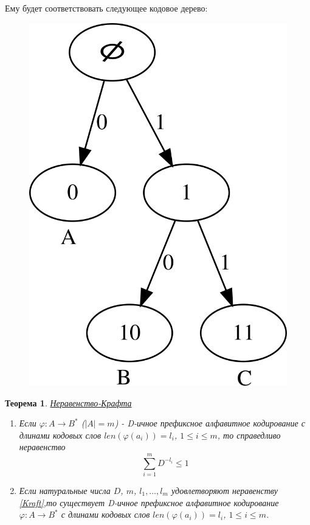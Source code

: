 \documentclass[14pt,a4paper,russian]{article}
\newtheorem{teor}{Теорема}[section]
\begin{document}
Ему будет соответствовать следующее кодовое дерево:
\begin{figure}[H]
	\centering
	\includegraphics{img/graph}
	\caption{}
	\label{fig:graph}
\end{figure}

\begin{teor}
	\uline{Неравенство-Крафта}
	\begin{enumerate}
		\item Если $\varphi \colon A \rightarrow B^*$ ($|A| = m$) - D-ичное префиксное алфавитное кодирование с длинами кодовых слов $len(\varphi(a_i)) = l_i$, $1 \le i \le m$, то справедливо неравенство
		\begin{equation}
			\sum\limits_{i=1}^{m} D^{-l_i} \le 1 \label{Kraft}
		\end{equation}
		\item Если натуральные числа $D$, $m$, $l_1, \ldots, l_m$ удовлетворяют неравенству \ref{Kraft},то существует D-ичное префиксное алфавитное кодирование $\varphi \colon A \rightarrow B^*$ с длинами кодовых слов $len(\varphi(a_i)) = l_i$, $1 \le i \le m$.
	\end{enumerate}
\end{teor}
\end{document}

